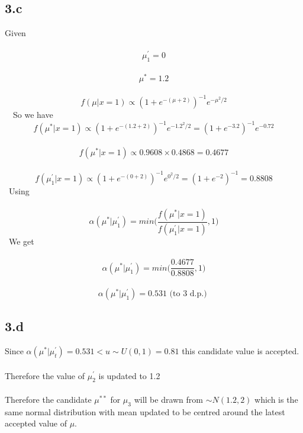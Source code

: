\documentclass[11pt]{article}   	%
\begin{document}
\subsection*{3.c}

Given \\
\
\[ \mu^\prime_1 = 0 \]
\
\[ \mu^* = 1.2 \]
\
\[ f(\mu | x = 1) \propto (1 + e^{-(\mu+2)})^{-1} e^{-\mu^2 / 2} \] \
\
So we have
\\
\[ f(\mu^* | x = 1) \propto (1 + e^{-(1.2+2)})^{-1} e^{-1.2^2 / 2} = (1 + e^{-3.2})^{-1} e^{-0.72} \]
\
\[ f(\mu^* | x = 1) \propto 0.9608 \times 0.4868 = 0.4677 \]
\
\[ f(\mu^{\prime}_1 | x = 1) \propto (1 + e^{-(0+2)})^{-1} e^{0^2 / 2} = (1 + e^{-2})^{-1} = 0.8808 \]
\
Using \\
\
\[ \alpha(\mu^* | \mu_1^\prime) = min \Big( \frac { f(\mu^* | x = 1 ) } { f(\mu^\prime_1 | x = 1 )}, 1 \Big) \]
\
We get \\
\
\[ \alpha(\mu^* | \mu^\prime_1) = min \Big( \frac { 0.4677 } { 0.8808 }, 1 \Big) \]
\
\[ \alpha(\mu^* | \mu^\prime_1) = 0.531 \text{ (to 3 d.p.) } \]


\subsection*{3.d}

Since $ \alpha(\mu^* | \mu^\prime_t) = 0.531 < u \sim U(0, 1) = 0.81 $ this candidate value is accepted. \\
\\
Therefore the value of $ \mu^{\prime}_2 $ is updated to 1.2 \\
\\
Therefore the candidate $ \mu^{**} $ for $ \mu_3 $ will be drawn from $ \sim N(1.2, 2) $ which is the same normal distribution with mean updated to be centred around the latest accepted value of $ \mu $. \\
\\
\end{document}
